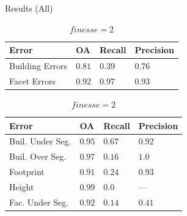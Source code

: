 \documentclass{beamer}
\begin{document}
            \begin{frame}[plain]{Results (All)}
                \begin{table}
                    \begin{subtable}{.4\textwidth}
                        \tiny
                        \begin{center}
                            \begin{tabular}{x{1cm} x{.5cm} x{.5cm} x{.5cm}}
                                \toprule
                                {\bf Error} & {\bf OA} & {\bf Recall} & {\bf Precision} \\
                                \midrule
                                Building Errors & $0.81$ & $0.39$ & $0.76$ \\
                                \midrule
                                Facet Errors & $0.92$ & $0.97$ & $0.93$ \\
                                \bottomrule
                            \end{tabular}
                            \caption{\tiny\label{tab::finesse2} $finesse = 2$}
                        \end{center}
                    \end{subtable}
                    \begin{subtable}{.45\textwidth}
                        \tiny
                        \begin{center}
                            \begin{tabular}{x{1.75cm} x{.5cm} x{.5cm} x{.5cm}}
                                \toprule
                                {\bf Error} & {\bf OA} & {\bf Recall} & {\bf Precision} \\
                                \midrule
                                Buil. Under Seg. & $0.95$ & $0.67$ & $0.92$ \\
                                \midrule
                                Buil. Over Seg. & $0.97$ & $0.16$ & $1.0$ \\
                                \midrule
                                Footprint & $0.91$ & $0.24$ & $0.93$ \\
                                \midrule
                                Height & $0.99$ & $0.0$ & --- \\
                                \midrule
                                \midrule
                                Fac. Under Seg. & $0.92$ & $0.14$ & $0.41$ \\

\end{tabular}
\end{center}
\end{subtable}
\end{table}
\end{frame}
\end{document}
